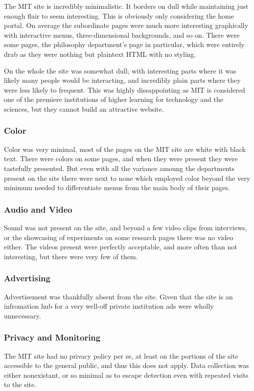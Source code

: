 The MIT site is incredibly minimalistic. It borders on dull while maintaining just enough flair
to seem interesting. This is obviously only considering the home portal. On average the
subordinate pages were much more interesting graphically with interactive menus,
three-dimensional backgrounds, and so on. There were some pages, the philosophy department's
page in particular, which were entirely drab as they were nothing but plaintext HTML with no
styling.

On the whole the site was somewhat dull, with interesting parts where it was likely many
people would be interacting, and incredibly plain parts where they were less likely to
frequent. This was highly dissappointing as MIT is considered one of the premiere
institutions of higher learning for technology and the sciences, but they cannot build an
attractive website.


\subsubsection*{Color}

Color was very minimal, most of the pages on the MIT site are white with black text. There
were colors on some pages, and when they were present they were tastefully presented. But
even with all the variance amoung the departments present on the site there were next to none
which employed color beyond the very minimum needed to differentiate menus from the main
body of their pages.


\subsubsection*{Audio and Video}

Sound was not present on the site, and beyond a few video clips from interviews, or the
showcasing of experiments on some research pages there was no video either. The videos
present were perfectly acceptable, and more often than not interesting, but there were very
few of them.


\subsubsection*{Advertising}

Advertisement was thankfully absent from the site. Given that the site is an infromation hub
for a very well-off private institution ads were wholly unnecessary.


\subsubsection*{Privacy and Monitoring}

The MIT site had no privacy policy per se, at least on the portions of the site accessible to the
general public, and thus this does not apply. Data collection was either nonexistant, or so
minimal as to escape detection even with repeated visits to the site.

